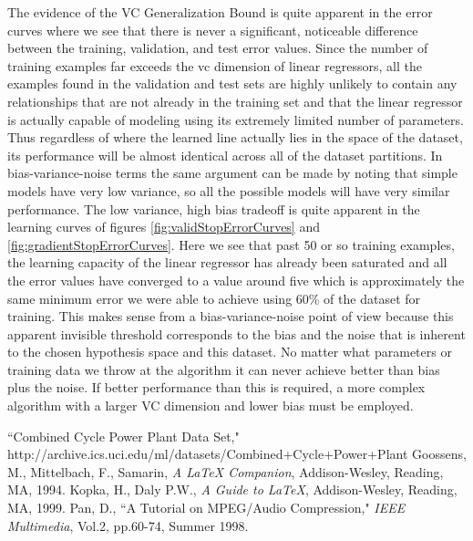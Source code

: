 \documentclass[runningheads]{llncs_2}
\begin{document}
The evidence of the VC Generalization Bound is quite apparent in the error curves where we see that there is never a significant, noticeable difference between the training, validation, and test error values. Since the number of training examples far exceeds the vc dimension of linear regressors, all the examples found in the validation and test sets are highly unlikely to contain any relationships that are not already in the training set and that the linear regressor is actually capable of modeling using its extremely limited number of parameters. Thus regardless of where the learned line actually lies in the space of the dataset, its performance will be almost identical across all of the dataset partitions. In bias-variance-noise terms the same argument can be made by noting that simple models have very low variance, so all the possible models will have very similar performance. The low variance, high bias tradeoff is quite apparent in the learning curves of figures \ref{fig:validStopErrorCurves} and \ref{fig:gradientStopErrorCurves}. Here we see that past 50 or so training examples, the learning capacity of the linear regressor has already been saturated and all the error values have converged to a value around five which is approximately the same minimum error we were able to achieve using 60\% of the dataset for training. This makes sense from a bias-variance-noise point of view because this apparent invisible threshold corresponds to the bias and the noise that is inherent to the chosen hypothesis space and this dataset. No matter what parameters or training data we throw at the algorithm it can never achieve better than bias plus the noise. If better performance than this is required, a more complex algorithm with a larger VC dimension and lower bias must be employed.


\begin{thebibliography}{100} %
	\addtolength{\leftmargin}{0.2in} %
	\setlength{\itemindent}{-0.2in}
	 ``Combined Cycle Power Plant Data Set," http://archive.ics.uci.edu/ml/datasets/Combined+Cycle+Power+Plant
	 Goossens, M., Mittelbach, F., Samarin, \emph{A LaTeX
		Companion}, Addison-Wesley, Reading, MA, 1994.
	 Kopka, H., Daly P.W., \emph{A Guide to LaTeX},
	Addison-Wesley, Reading, MA, 1999.
	 Pan, D., ``A Tutorial on MPEG/Audio Compression,"
	\emph{IEEE Multimedia}, Vol.2, pp.60-74, Summer 1998.
\end{thebibliography}
\end{document}
